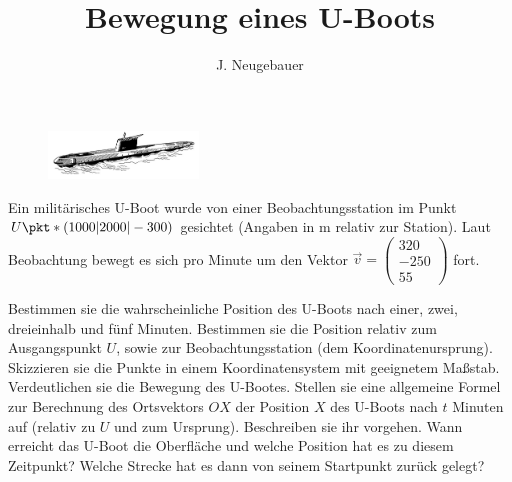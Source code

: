 \documentclass[10pt, a4paper]{scrartcl}
\author{J. Neugebauer}
\title{Bewegung eines U-Boots}
\date{\Heute}
\begin{document}
\ReiheTitel
\begin{aufgabe}
	\begin{figure}
		\includegraphics[width=4cm]{Q2-AB.4-Abb_U-Boot.jpg}
	\end{figure}
	Ein militärisches U-Boot wurde von einer Beobachtungsstation im Punkt $U\pkt*(1000|2000|-300)$ 
	gesichtet (Angaben in \si{\meter} relativ zur Station). Laut Beobachtung bewegt es sich pro Minute
	um den Vektor $\vec{v} = \begin{pmatrix} 320 \\ -250 \\ 55 \end{pmatrix}$ fort.
		
	\begin{teilaufgaben}
		\teilaufgabe Bestimmen sie die wahrscheinliche Position des U-Boots nach einer, zwei, dreieinhalb und fünf Minuten. Bestimmen sie die Position relativ zum Ausgangspunkt $U$,
		sowie zur Beobachtungsstation (dem Koordinatenursprung).
		\teilaufgabe Skizzieren sie die Punkte in einem Koordinatensystem mit geeignetem Maßstab. 
		Verdeutlichen sie die Bewegung des U-Bootes.
		\teilaufgabe Stellen sie eine allgemeine Formel zur Berechnung des Ortsvektors $OX$ der Position $X$ des U-Boots nach $t$ Minuten auf (relativ zu $U$ und zum Ursprung). Beschreiben sie ihr vorgehen.
		\teilaufgabe\symStern Wann erreicht das U-Boot die Oberfläche und welche Position hat es zu diesem Zeitpunkt? Welche Strecke hat es dann von seinem Startpunkt zurück gelegt?
	\end{teilaufgaben}
\end{aufgabe}
\end{document}
